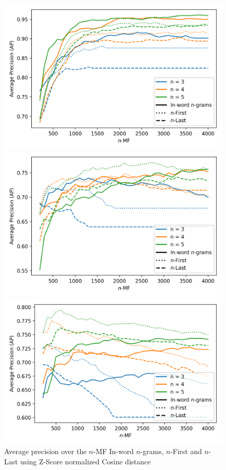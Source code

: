\begin{figure}
  \centering
  \caption{Average precision over the $n$-MF In-word $n$-grams, $n$-First and $n$-Last using Z-Score normalized Cosine distance}
  \label{fig:first_last_letters_ngrams}

  \label{fig:first_last_letters_ngrams_oxquarry}
  \includegraphics[width=\linewidth]{img/first_last_letters_ngrams_oxquarry.png}

  \vspace{0.5cm}

  \label{fig:first_last_letters_ngrams_brunet}
  \includegraphics[width=\linewidth]{img/first_last_letters_ngrams_brunet.png}

  \vspace{0.5cm}

  \label{fig:first_last_letters_ngrams_st_jean}
  \includegraphics[width=\linewidth]{img/first_last_letters_ngrams_st_jean.png}
\end{figure}

